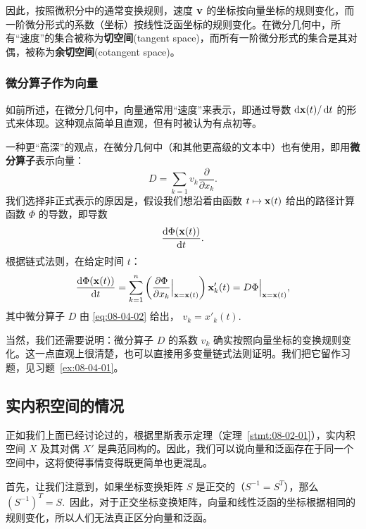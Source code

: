 

因此，按照微积分中的通常变换规则，速度 $\mathbf{v}$ 的坐标按向量坐标的规则变化，而一阶微分形式的系数（坐标）按线性泛函坐标的规则变化。在微分几何中，所有“速度”的集合被称为\textbf{切空间}(tangent space)，而所有一阶微分形式的集合是其对偶，被称为\textbf{余切空间}(cotangent space)。


\subsubsection{微分算子作为向量}\label{sec:08-04-02-03}

如前所述，在微分几何中，向量通常用“速度”来表示，即通过导数 $\mathop{}\!\mathrm{d} \mathbf{x}(t)/\mathop{}\!\mathrm{d} t$ 的形式来体现。这种观点简单且直观，但有时被认为有点初等。

一种更“高深”的观点，在微分几何中（和其他更高级的文本中）也有使用，即用\textbf{微分算子}表示向量：
\begin{equation}\label{eq:08-04-02}
D = \sum_{k=1} v_k \frac{\partial}{\partial x_k}.
\end{equation}
我们选择非正式表示的原因是，假设我们想沿着由函数 $t \mapsto \mathbf{x}(t)$ 给出的路径计算函数 $\Phi$ 的导数，即导数 $$\frac{\mathop{}\!\mathrm{d} \Phi(\mathbf{x}(t))}{\mathop{}\!\mathrm{d} t}.$$根据链式法则，在给定时间 $t$：
$$ \frac{\mathop{}\!\mathrm{d} \Phi(\mathbf{x}(t))}{\mathop{}\!\mathrm{d} t} = \sum_{k=1}^n \left( \frac{\partial \Phi}{\partial x_k} \Big|_{\mathbf{x}=\mathbf{x}(t)} \right) \mathbf{x}'_k(t) = D\Phi \Big|_{\mathbf{x}=\mathbf{x}(t)} ,$$
其中微分算子 $D$ 由 \eqref{eq:08-04-02} 给出， $v_k = x'_k(t)$.~

当然，我们还需要说明：微分算子 $D$ 的系数 $v_k$ 确实按照向量坐标的变换规则变化。这一点直观上很清楚，也可以直接用多变量链式法则证明。我们把它留作习题，见习题~\ref{ex:08-04-01}。

\subsection{实内积空间的情况}\label{sec:08-04-03}

正如我们上面已经讨论过的，根据里斯表示定理（定理~\ref{stmt:08-02-01}），实内积空间 $X$ 及其对偶 $X'$ 是典范同构的。因此，我们可以说向量和泛函存在于同一个空间中，这将使得事情变得既更简单也更混乱。

\begin{remark*}
首先，让我们注意到，如果坐标变换矩阵 $S$ 是正交的（$S^{-1} = S^T$），那么 $(S^{-1})^T = S$.~因此，对于正交坐标变换矩阵，向量和线性泛函的坐标根据相同的规则变化，所以人们无法真正区分向量和泛函。
\end{remark*}

